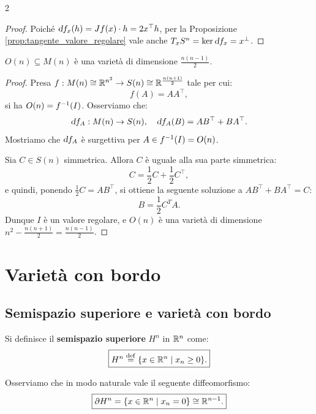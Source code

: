\begin{multicols*}{2}
\begin{proof}
        Poiché $\dif f_x(h) = Jf(x) \cdot h = 2x^\top h$, per la
        Proposizione \ref{prop:tangente_valore_regolare} vale
        anche $T_x S^n = \ker \dif f_x = x^\perp$.
    \end{proof}

    \begin{corollary}
        $O(n) \subseteq M(n)$ è una varietà di dimensione $\frac{n(n-1)}{2}$.
    \end{corollary}

    \begin{proof}
        Presa $f : M(n) \cong \mathbb{R}^{n^2} \to S(n) \cong \mathbb{R}^{\frac{n(n+1)}{2}}$ tale per cui:
        \[ f(A) = AA^\top, \]
        si ha $O(n) = f^{-1}(I)$. Osserviamo che:
        \[ \dif f_A : M(n) \to S(n), \quad \dif f_A(B) = AB^\top + B A^\top. \]
        Mostriamo che $\dif f_A$ è surgettiva per $A \in f^{-1}(I) = O(n)$. \smallskip

        Sia $C \in S(n)$ simmetrica. Allora $C$ è uguale
        alla sua parte simmetrica:
        \[
            C = \frac{1}{2} C + \frac{1}{2} C^\top,
        \]
        e quindi, ponendo $\frac{1}{2} C = AB^\top$, si ottiene la seguente
        soluzione a $AB^\top + BA^\top = C$:
        \[
            B = \frac{1}{2} C^TA.
        \]
        Dunque $I$ è un valore regolare, e $O(n)$ è una varietà
        di dimensione $n^2 - \frac{n(n+1)}{2} = \frac{n(n-1)}{2}$.
    \end{proof}

    \section{Varietà con bordo}

    \subsection{Semispazio superiore e varietà con bordo}

    \begin{definition}
        Si definisce il \textbf{semispazio superiore} $H^n$ in $\mathbb{R}^n$ come:
        \[
            \boxed{H^n \overset{\mathrm{def}}{=} \{x \in \mathbb{R}^n \mid x_n \geq 0\}.}
        \]
    \end{definition}

    \begin{remark} \label{rmk:hn_diffeo_rn-1}
        Osserviamo che in modo naturale vale il seguente diffeomorfismo:
        \[
            \boxed{\partial H^n = \{ x \in \mathbb{R}^n \mid x_n = 0 \} \cong \mathbb{R}^{n-1}.}
        \]
    \end{remark}


\end{multicols*}
